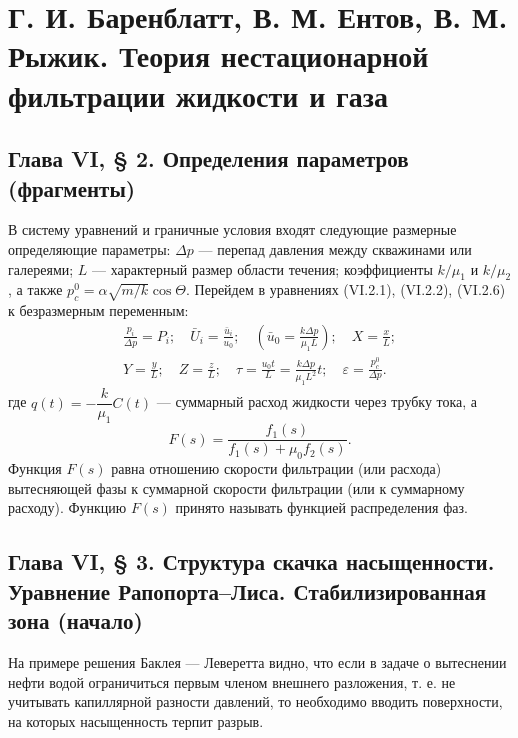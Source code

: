 \section*{Г. И. Баренблатт, В. М. Ентов, В. М. Рыжик. Теория нестационарной фильтрации жидкости и газа}
\subsection*{Глава VI, § 2. Определения параметров (фрагменты)}
В систему уравнений и граничные условия входят следующие размерные определяющие параметры: $\Delta p$ --- перепад давления между скважинами или галереями; $L$ --- характерный размер области течения; коэффициенты $k/\mu_1$ и $k/\mu_2$, а также $p_c^0=\alpha\sqrt{m/k}\cos\Theta$. Перейдем в уравнениях (VI.2.1), (VI.2.2), (VI.2.6) к безразмерным переменным:
\[\begin{gathered}
\frac{p_i}{\Delta p}=P_i;\quad\bar U_i=\frac{\bar u_i}{u_0};\quad\left(\bar u_0=\frac{k\Delta p}{\mu_1L}\right);\quad X=\frac{x}{L};\\
Y=\frac{y}{L};\quad Z=\frac{z}{L};\quad\tau=\frac{u_0t}{L}=\frac{k\Delta p}{\mu_1L^2}t;\quad\varepsilon=\frac{p_c^0}{\Delta p}.
\end{gathered}\]
где $q(t)=-\dfrac{k}{\mu_1}C(t)$ --- суммарный расход жидкости через трубку тока, а
\[F(s)=\frac{f_1(s)}{f_1(s)+\mu_0f_2(s)}.\]
Функция $F(s)$ равна отношению скорости фильтрации (или расхода) вытесняющей фазы к суммарной скорости фильтрации (или к суммарному расходу). Функцию $F(s)$ принято называть функцией распределения фаз.


\subsection*{Глава VI, § 3. Структура скачка насыщенности. Уравнение Рапопорта--Лиса. Стабилизированная зона (начало)}
На примере решения Баклея --- Леверетта видно, что если в задаче о вытеснении нефти водой ограничиться первым членом внешнего разложения, т. е. не учитывать капиллярной разности давлений, то необходимо вводить поверхности, на которых насыщенность терпит разрыв.

